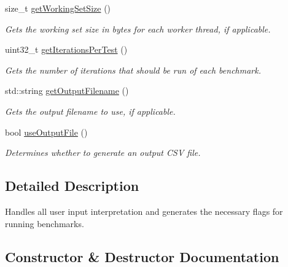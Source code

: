 \begin{DoxyCompactItemize}
size\+\_\+t \hyperlink{classxmem_1_1config_1_1_configurator_ad237760f0e0f76add3693bded410d749}{get\+Working\+Set\+Size} ()
\begin{DoxyCompactList}\small\item\em Gets the working set size in bytes for each worker thread, if applicable. \end{DoxyCompactList}\item 
uint32\+\_\+t \hyperlink{classxmem_1_1config_1_1_configurator_a0cae90ae39a85c42b884f59c983ddb98}{get\+Iterations\+Per\+Test} ()
\begin{DoxyCompactList}\small\item\em Gets the number of iterations that should be run of each benchmark. \end{DoxyCompactList}\item 
std\+::string \hyperlink{classxmem_1_1config_1_1_configurator_ad05eaa100414599543085778ca75ff64}{get\+Output\+Filename} ()
\begin{DoxyCompactList}\small\item\em Gets the output filename to use, if applicable. \end{DoxyCompactList}\item 
bool \hyperlink{classxmem_1_1config_1_1_configurator_a10a655ca8cea9e4d1f65e3f907a858a1}{use\+Output\+File} ()
\begin{DoxyCompactList}\small\item\em Determines whether to generate an output C\+S\+V file. \end{DoxyCompactList}\end{DoxyCompactItemize}


\subsection{Detailed Description}
Handles all user input interpretation and generates the necessary flags for running benchmarks. 

\subsection{Constructor \& Destructor Documentation}
\hypertarget{classxmem_1_1config_1_1_configurator_ab687c798957f36943f2af563fd67f402}{}
